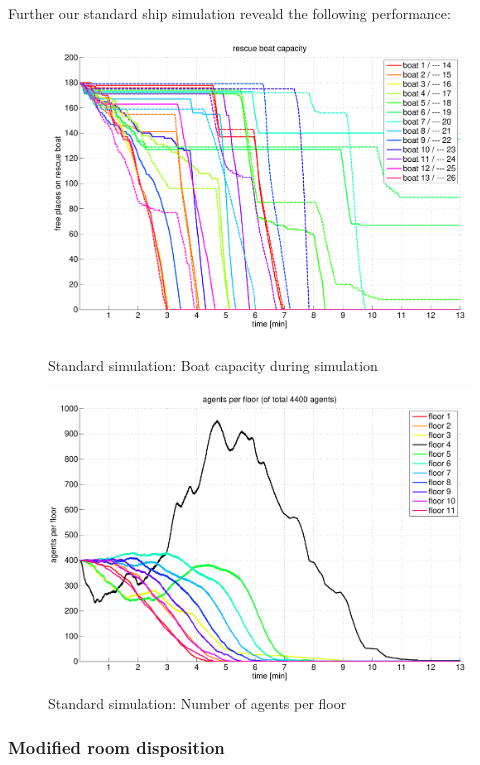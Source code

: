\documentclass[11pt]{article}
\begin{document}
Further our standard ship simulation reveald the following performance:

\begin{figure}[htbp]
\centering
{\begin{minipage}[t]{7.4cm}
\includegraphics[width=\textwidth]{run1-standard-rescueboatcapacity.pdf}
\caption{Standard simulation: Boat capacity during simulation}
\end{minipage}}
{\begin{minipage}[t]{7.4cm}
\includegraphics[width=\textwidth]{run1-standard-agentsperfloor.pdf}
\caption{Standard simulation: Number of agents per floor}
\end{minipage}}
\end{figure}

\subsubsection{Modified room disposition}
\end{document}
